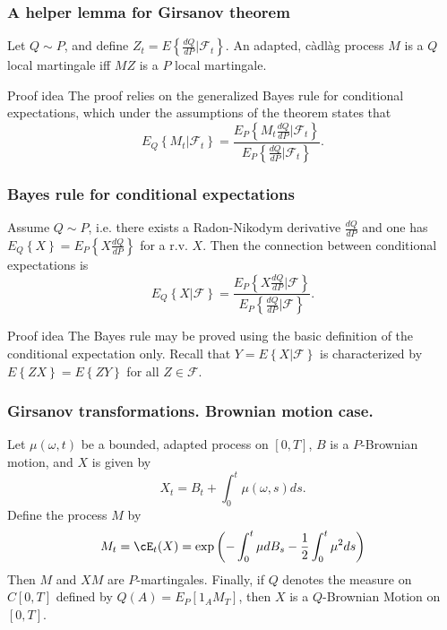 \begin{frame}
    \frametitle{A helper lemma for Girsanov theorem}
    
    Let $Q \sim P$, and define $Z_t = E\left\{ \frac{dQ}{dP} | \mathcal F_t \right\}$. An
    adapted, c\`adl\`ag process $M$ is a $Q$ local martingale iff $MZ$ is a $P$ local martingale.

    \begin{block}{Proof idea}
    The proof relies on the generalized Bayes rule for conditional expectations, which under
    the assumptions of the theorem states that
    \begin{equation}
        E_Q \left\{ M_t | \mathcal F_t \right\} = \frac{ E_P \left\{ M_t \frac{dQ}{dP} | \mathcal F_t \right\}}{ E_P \left\{ \frac{dQ}{dP} | \mathcal F_t \right\}  }.
    \end{equation}
    \end{block}
\end{frame}


\begin{frame}
    \frametitle{Bayes rule for conditional expectations}
    
    Assume $Q \sim P$, i.e. there exists a Radon-Nikodym derivative
    $\frac{dQ}{dP}$ and one has $E_Q \left\{ X \right\} = E_P \left\{ X \frac{dQ}{dP} \right\}$ for
    a r.v. $X$. Then the connection between conditional expectations is
    \begin{equation}
        E_Q \left\{ X | \mathcal F \right\} = \frac{ E_P \left\{ X \frac{dQ}{dP} | \mathcal F \right\}}{ E_P \left\{ \frac{dQ}{dP} | \mathcal F \right\}  }.
        \label{}
    \end{equation}

    \begin{block}{Proof idea}
        The Bayes rule may be proved using the basic definition of the conditional 
        expectation only. Recall that $Y=E\left\{ X | \mathcal F \right\}$ is characterized
        by $E\left\{ ZX \right\} = E\left\{ ZY \right\}$ for all $Z\in \mathcal F$.
    \end{block}
\end{frame}


\begin{frame}
    \frametitle{Girsanov transformations. Brownian motion case.}
    
    Let $\mu(\omega, t)$ be a bounded, adapted process on $[0,T]$, $B$ is a $P$-Brownian
    motion, and $X$ is given by 
    \begin{equation}
        X_t = B_t + \int_{0}^{t} \mu(\omega, s) ds.
    \end{equation}
    Define the process $M$ by
    \begin{equation}
        M_t = \cE_t(X) = 
        \exp\left(  - \int_{0}^{t} \mu dB_s - \frac{1}{2} \int_{0}^{t} \mu^2 ds \right)
    \end{equation}
    Then $M$ and $XM$ are $P$-martingales. Finally, if $Q$ denotes the measure on $C[0,T]$ 
    defined by $Q(A) = E_P \left[ 1_A M_T \right]$, then $X$ is a $Q$-Brownian Motion on $[0,T]$.
\end{frame}



